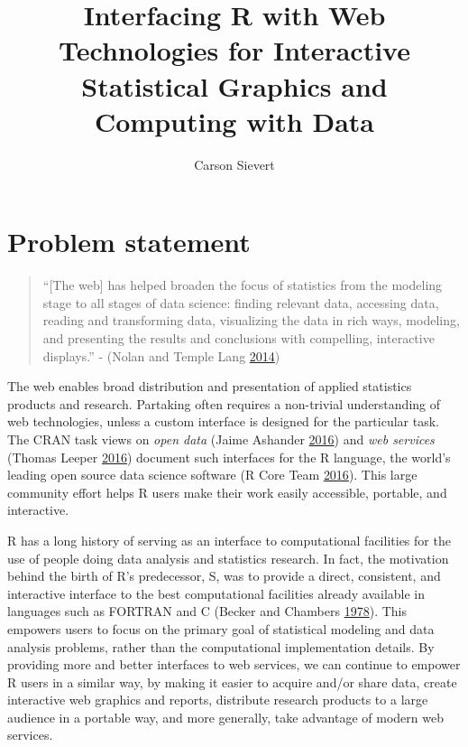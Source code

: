 \documentclass[12pt,]{isuthesis}
\title{Interfacing R with Web Technologies for Interactive Statistical Graphics
and Computing with Data}
\author{Carson Sievert}
\date{}
\begin{document}
\maketitle

{
\hypersetup{linkcolor=black}
\setcounter{tocdepth}{2}
\tableofcontents
}
\listoftables
\cleardoublepage {} {}
\listoffigures

\cleardoublepage {}


\newpage
{}

\chapter{Problem statement}

\begin{quote}
``{[}The web{]} has helped broaden the focus of statistics from the
modeling stage to all stages of data science: finding relevant data,
accessing data, reading and transforming data, visualizing the data in
rich ways, modeling, and presenting the results and conclusions with
compelling, interactive displays.'' - (Nolan and Temple Lang
\protect\hyperlink{ref-nolan-lang}{2014})
\end{quote}

The web enables broad distribution and presentation of applied
statistics products and research. Partaking often requires a non-trivial
understanding of web technologies, unless a custom interface is designed
for the particular task. The CRAN task views on \emph{open data} (Jaime
Ashander \protect\hyperlink{ref-OpenData}{2016}) and \emph{web services}
(Thomas Leeper \protect\hyperlink{ref-WebServices}{2016}) document such
interfaces for the R language, the world's leading open source data
science software (R Core Team \protect\hyperlink{ref-RCore}{2016}). This
large community effort helps R users make their work easily accessible,
portable, and interactive.

R has a long history of serving as an interface to computational
facilities for the use of people doing data analysis and statistics
research. In fact, the motivation behind the birth of R's predecessor,
S, was to provide a direct, consistent, and interactive interface to the
best computational facilities already available in languages such as
FORTRAN and C (Becker and Chambers
\protect\hyperlink{ref-S:1978}{1978}). This empowers users to focus on
the primary goal of statistical modeling and data analysis problems,
rather than the computational implementation details. By providing more
and better interfaces to web services, we can continue to empower R
users in a similar way, by making it easier to acquire and/or share
data, create interactive web graphics and reports, distribute research
products to a large audience in a portable way, and more generally, take
advantage of modern web services.
\end{document}
